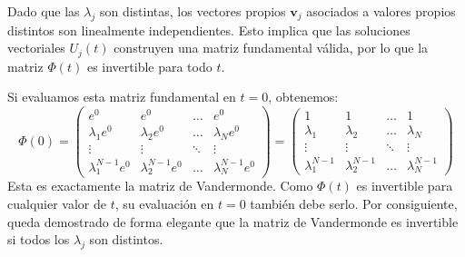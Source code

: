 {\begin{enumerate}
        Dado que las $\lambda_j$ son distintas, los vectores propios $\mathbf{v}_j$ asociados a valores propios distintos son linealmente independientes. Esto implica que las soluciones vectoriales $U_j(t)$ construyen una matriz fundamental válida, por lo que la matriz $\Phi(t)$ es invertible para todo $t$. 
        
        Si evaluamos esta matriz fundamental en $t = 0$, obtenemos:
        $$\Phi(0) = \begin{pmatrix}
            e^0 & e^0 & \dots & e^0 \\
            \lambda_1 e^0 & \lambda_2 e^0 & \dots & \lambda_N e^0 \\
            \vdots & \vdots & \ddots & \vdots \\
            \lambda_1^{N-1} e^0 & \lambda_2^{N-1} e^0 & \dots & \lambda_N^{N-1} e^0
        \end{pmatrix} = \begin{pmatrix} 
            1 & 1 & \dots & 1 \\ 
            \lambda_1 & \lambda_2 & \dots & \lambda_N \\ 
            \vdots & \vdots & \ddots & \vdots \\ 
            \lambda_1^{N-1} & \lambda_2^{N-1} & \dots & \lambda_N^{N-1} 
        \end{pmatrix}$$
        Esta es exactamente la matriz de Vandermonde. Como $\Phi(t)$ es invertible para cualquier valor de $t$, su evaluación en $t=0$ también debe serlo. Por consiguiente, queda demostrado de forma elegante que la matriz de Vandermonde es invertible si todos los $\lambda_j$ son distintos.
    \end{enumerate}
}

